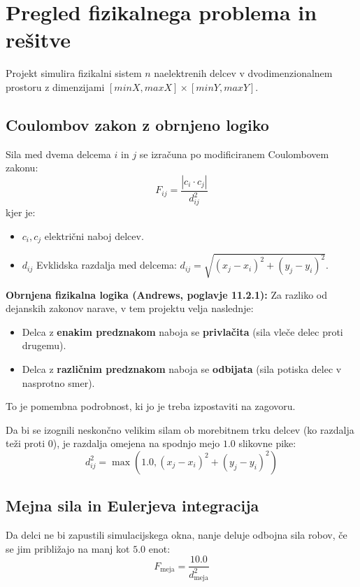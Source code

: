 \documentclass[11pt,a4paper]{article}
\begin{document}
\newpage
\section{Pregled fizikalnega problema in re\v{s}itve}

Projekt simulira fizikalni sistem $n$ naelektrenih delcev v dvodimenzionalnem prostoru z dimenzijami $[minX, maxX] \times [minY, maxY]$. 

\subsection{Coulombov zakon z obrnjeno logiko}
Sila med dvema delcema $i$ in $j$ se izra\v{c}una po modificiranem Coulombovem zakonu:
\begin{equation}
    F_{ij} = \frac{|c_i \cdot c_j|}{d_{ij}^2}
\end{equation}
kjer je:
\begin{itemize}
    \item $c_i, c_j$ elektri\v{c}ni naboj delcev.
    \item $d_{ij}$ Evklidska razdalja med delcema: $d_{ij} = \sqrt{(x_j - x_i)^2 + (y_j - y_i)^2}$.
\end{itemize}

\begin{kljucno}
\textbf{Obrnjena fizikalna logika (Andrews, poglavje 11.2.1):}
Za razliko od dejanskih zakonov narave, v tem projektu velja naslednje:
\begin{itemize}
    \item Delca z \textbf{enakim predznakom} naboja se \textbf{privla\v{c}ita} (sila vle\v{c}e delec proti drugemu).
    \item Delca z \textbf{razli\v{c}nim predznakom} naboja se \textbf{odbijata} (sila potiska delec v nasprotno smer).
\end{itemize}
To je pomembna podrobnost, ki jo je treba izpostaviti na zagovoru.
\end{kljucno}

Da bi se izognili neskon\v{c}no velikim silam ob morebitnem trku delcev (ko razdalja teži proti 0), je razdalja omejena na spodnjo mejo $1.0$ slikovne pike:
\begin{equation}
    d_{ij}^2 = \max(1.0, (x_j - x_i)^2 + (y_j - y_i)^2)
\end{equation}

\subsection{Mejna sila in Eulerjeva integracija}
Da delci ne bi zapustili simulacijskega okna, nanje deluje odbojna sila robov, \v{c}e se jim približajo na manj kot $5.0$ enot:
\begin{equation}
    F_{\text{meja}} = \frac{10.0}{d_{\text{meja}}^2}
\end{equation}
\end{document}
